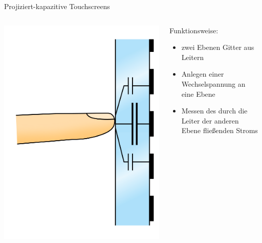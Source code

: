 \documentclass[12pt]{beamer}
\begin{document}
	\begin{frame}{Projiziert-kapazitive Touchscreens}
		\begin{columns}
			\begin{column}{0.4\textwidth}
				\includegraphics[width=\textwidth]{../Images/ProjectedCapacitiveTouchScreen.png}
			\end{column}
			\begin{column}{0.6\textwidth}
				Funktionsweise:
				\begin{itemize}
					\item<1-> zwei Ebenen Gitter aus Leitern
					\item<2-> Anlegen einer Wechselspannung an eine Ebene
					\item<3-> Messen des durch die Leiter der anderen Ebene fließenden Stroms
				\end{itemize}
			\end{column}
		\end{columns}
	\end{frame}
	
\end{document}
